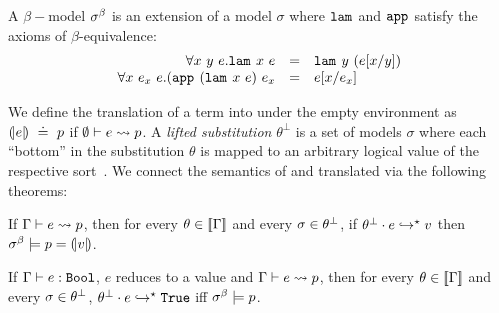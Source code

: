 %
\begin{definition}\label{def:beta-model}
A $\beta-$model $\sigma^\beta$ is an extension of a model $\sigma$
where $\texttt{lam}^{}_{}$ and $\texttt{app}^{}_{}$
satisfy the axioms of $\beta$-equivalence:
$$
\begin{array}{rcl}
\forall x\ y\ e. \texttt{lam}^{}_{}\ x\ e
  & = & \texttt{lam}^{}_{}\ y\ (e[{x}/{y}]) \\
\forall x\ e_x\ e. (\texttt{app}^{}_{}\ (\texttt{lam}^{}_{}\ x\ e)\ e_x
  & = &  e[{x}/{e_x}]
\end{array}
$$
\end{definition}

%
We define the translation of a \corelan term
into \smtlan under the empty environment as
${(\!|e|\!) \ \doteq\  p}$
if ${ \emptyset\vdash e \rightsquigarrow p }$.
%
A \emph{lifted substitution}
$\theta^\perp$ is a set of models $\sigma$
where each ``bottom'' in the substitution
$\theta$ is mapped to an arbitrary logical
value of the respective sort~\citep{Vazou14}.
%
We connect the semantics of \corelan and translated
\smtlan via the following theorems:

\begin{theorem}\label{thm:embedding-general}
If ${ \Gamma\vdash e \rightsquigarrow p }$,
then for every ${\theta\in[\![\Gamma]\!]}$
and every ${\sigma\in {\ensuremath{\theta}^\perp}}$,
if ${{\theta^\perp} \cdot {\ensuremath{e}} }\hookrightarrow^{\star}{v}$
then $\sigma^\beta \models p = (\!|v|\!)$.
\end{theorem}


\begin{corollary}\label{thm:appendix:embedding}
If ${\Gamma \vdash e : \texttt{Bool}}$, $e$ reduces to a value and
${ \Gamma\vdash e \rightsquigarrow p }$,
then for every ${\theta\in[\![\Gamma]\!]}$
and every ${\sigma\in {\ensuremath{\theta}^\perp}}$,
${{\theta^\perp} \cdot {\ensuremath{e}} }\hookrightarrow^{\star}{\texttt{True}}$ iff
$\sigma^\beta \models p$.
\end{corollary}



